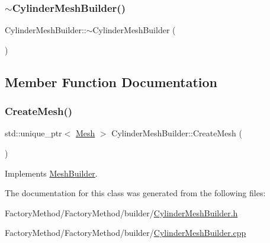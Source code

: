 \mbox{\label{class_cylinder_mesh_builder_a2a95f192993e407f42001d64340f8f7d}} 
\subsubsection{\texorpdfstring{$\sim$CylinderMeshBuilder()}{~CylinderMeshBuilder()}}
{\footnotesize\ttfamily Cylinder\+Mesh\+Builder\+::$\sim$\+Cylinder\+Mesh\+Builder (\begin{DoxyParamCaption}{ }\end{DoxyParamCaption})}



\subsection{Member Function Documentation}
\mbox{\label{class_cylinder_mesh_builder_a266221f05078711983a5c40f3edb58ba}} 
\subsubsection{\texorpdfstring{CreateMesh()}{CreateMesh()}}
{\footnotesize\ttfamily std\+::unique\+\_\+ptr$<$ \mbox{\hyperlink{class_mesh}{Mesh}} $>$ Cylinder\+Mesh\+Builder\+::\+Create\+Mesh (\begin{DoxyParamCaption}{ }\end{DoxyParamCaption})\hspace{0.3cm}{\ttfamily [virtual]}}



Implements \mbox{\hyperlink{class_mesh_builder_a41cfd23b93c25bc016c889c2c67a2637}{Mesh\+Builder}}.



The documentation for this class was generated from the following files\+:\begin{DoxyCompactItemize}
\item 
Factory\+Method/\+Factory\+Method/builder/\mbox{\hyperlink{_cylinder_mesh_builder_8h}{Cylinder\+Mesh\+Builder.\+h}}\item 
Factory\+Method/\+Factory\+Method/builder/\mbox{\hyperlink{_cylinder_mesh_builder_8cpp}{Cylinder\+Mesh\+Builder.\+cpp}}\end{DoxyCompactItemize}

